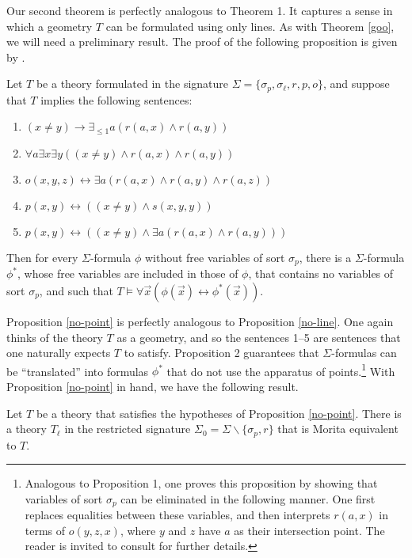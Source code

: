 Our second theorem is perfectly analogous to Theorem 1. It captures a
sense in which a geometry $T$ can be formulated using only lines. As
with Theorem \ref{goo}, we will need a preliminary result. The proof
of the following proposition is given by \citet[Proposition
4.89]{schwabhauser1983}.

\begin{prop} \label{no-point} Let $T$
  be a theory formulated in the signature
  $\Sigma = \{ \sigma _p ,\sigma _\ell,r,p, o\}$, and suppose that $T$
  implies the following sentences:
\begin{enumerate}
\item $(x\neq y)\to \exists _{\leq 1}a(r(a,x)\wedge r(a,y))$
\item $\forall a\exists x\exists y((x\neq y)\wedge r(a,x)\wedge r(a,y))$
\item $o(x,y,z)\leftrightarrow \exists a(r(a,x)\wedge r(a,y)\wedge r(a,z))$
\item $p(x,y)\leftrightarrow ((x\neq y)\wedge s(x,y,y))$
\item $p(x,y)\leftrightarrow ((x\neq y)\wedge \exists a(r(a,x)\wedge r(a,y)))$
\end{enumerate}
Then for every $\Sigma$-formula $\phi$ without free variables of sort $\sigma _p$, there is a $\Sigma$-formula $\phi^*$, whose free variables are included in those of $\phi$, that contains no variables of sort $\sigma_{p}$, and such that $T\vDash \forall \vec{x}(\phi (\vec{x})\leftrightarrow \phi^*(\vec{x})).$
\end{prop}
Proposition \ref{no-point} is perfectly analogous to Proposition
\ref{no-line}. One again thinks of the theory $T$ as a geometry, and
so the sentences 1--5 are sentences that one naturally expects $T$ to
satisfy. Proposition 2 guarantees that $\Sigma$-formulas can be
``translated'' into formulas $\phi^*$ that do not use the apparatus of
points.\footnote{Analogous to Proposition 1, one proves this
  proposition by showing that variables of sort $\sigma _p$ can be
  eliminated in the following manner. One first replaces equalities
  between these variables, and then interprets $r(a,x)$ in terms of
  $o(y,z,x)$, where $y$ and $z$ have $a$ as their intersection
  point. The reader is invited to consult \citet[Proposition
  4.89]{schwabhauser1983} for further details.} With Proposition
\ref{no-point} in hand, we have the following result.

\begin{thm}[Barrett]
  Let $T$ be a theory that satisfies the hypotheses of Proposition
  \ref{no-point}. There is a theory $T_\ell$ in the restricted
  signature $\Sigma_0=\Sigma \backslash\{\sigma_p, r\}$ that is Morita
  equivalent to $T$. \label{hoo}
\end{thm}

